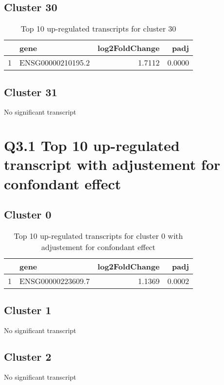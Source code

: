 \documentclass{article}
\begin{document}
\subsection{Cluster 30 }
\begin{table}[H]
\centering
\begin{tabular}{rlrr}
  \hline
 & gene & log2FoldChange & padj \\ 
  \hline
1 & ENSG00000210195.2 & 1.7112 & 0.0000 \\ 
   \hline
\end{tabular}
\caption{Top 10 up-regulated transcripts for cluster 30} 
\label{tab:q3_1_30}
\end{table}
\subsection{Cluster 31 }
No significant transcript
\section{Q3.1 Top 10 up-regulated transcript with adjustement for confondant effect}
\subsection{Cluster 0 }
\begin{table}[H]
\centering
\begin{tabular}{rlrr}
  \hline
 & gene & log2FoldChange & padj \\ 
  \hline
1 & ENSG00000223609.7 & 1.1369 & 0.0002 \\ 
   \hline
\end{tabular}
\caption{Top 10 up-regulated transcripts for cluster 0 with adjustement for confondant effect} 
\label{tab:q3_1_conf_0}
\end{table}
\subsection{Cluster 1 }
No significant transcript
\subsection{Cluster 2 }
No significant transcript
\end{document}
